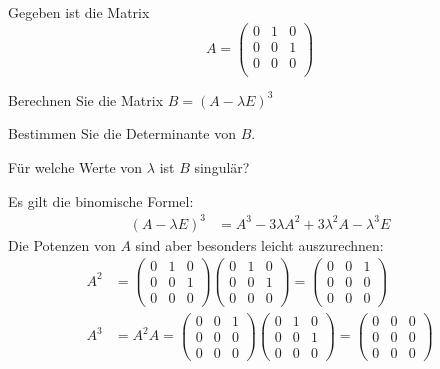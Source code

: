 Gegeben ist die Matrix
\[
A=\begin{pmatrix}
0&1&0\\
0&0&1\\
0&0&0\\
\end{pmatrix}
\]
\begin{teilaufgaben}
\item Berechnen Sie die Matrix $B=(A-\lambda E)^3$
\item Bestimmen Sie die Determinante von $B$.
\item Für welche Werte von $\lambda$ ist $B$ singulär?
\end{teilaufgaben}

\begin{loesung}
\begin{teilaufgaben}
\item Es gilt die binomische Formel:
\begin{align*}
(A-\lambda E)^3&=A^3-3\lambda A^2+3\lambda^2 A-\lambda^3 E
\end{align*}
Die Potenzen von $A$ sind aber besonders leicht auszurechnen:
\begin{align*}
A^2&=
\begin{pmatrix}
0&1&0\\
0&0&1\\
0&0&0
\end{pmatrix}
\begin{pmatrix}
0&1&0\\
0&0&1\\
0&0&0
\end{pmatrix}
=
\begin{pmatrix}
0&0&1\\
0&0&0\\
0&0&0
\end{pmatrix}
\\
A^3&=A^2A=
\begin{pmatrix}
0&0&1\\
0&0&0\\
0&0&0
\end{pmatrix}
\begin{pmatrix}
0&1&0\\
0&0&1\\
0&0&0
\end{pmatrix}
=\begin{pmatrix}
0&0&0\\
0&0&0\\
0&0&0
\end{pmatrix}
\\
\end{align*}

\end{teilaufgaben}
\end{loesung}
